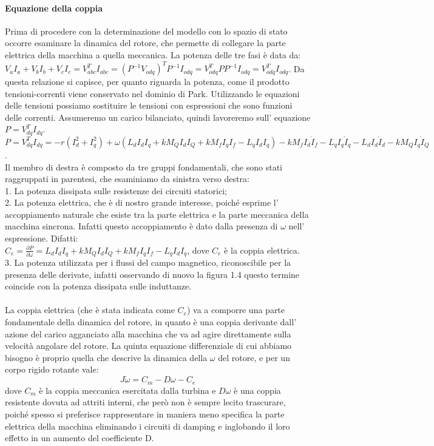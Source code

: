 \documentclass[Lau,noexaminfo]{sapthesis}
\begin{document}
	\paragraph{Equazione della coppia}
	Prima di procedere con la determinazione del modello con lo spazio di stato occorre esaminare la dinamica del rotore, che permette di collegare la parte elettrica della macchina a quella meccanica. La potenza delle tre fasi è data da:\\
	$V_a I_a + V_b I_b + V_c I_c = V^T_{abc} I_{abc}=(P^{-1}V_{odq})^T P^{-1}I_{odq}=V_{odq}^T P P^{-1} I_{odq}=V_{odq}^T I_{odq}$. Da questa relazione si capisce, per quanto riguarda la potenza, come il prodotto tensioni-correnti viene conservato nel dominio di Park. Utilizzando le equazioni delle tensioni possiamo sostituire le tensioni con espressioni che sono funzioni delle correnti. Assumeremo un carico bilanciato, quindi lavoreremo sull' equazione\\
	$P=V_{dq}^T I_{dq}$.\\
	$P=V_{dq}^T I_{dq}=-r(I_d^2+I_q^2) + \omega(L_d I_dI_q +kM_QI_dI_Q+kM_f I_qI_f-L_qI_dI_q) -kM_f I_d \dot{I}_f -L_qI_q \dot{I}_q - L_dI_d\dot{I}_d -kM_QI_q\dot{I}_Q$.\\
	Il membro di destra è composto da tre gruppi fondamentali, che sono stati raggruppati in parentesi, che esaminiamo da sinistra verso destra:\\
	1. La potenza dissipata sulle resistenze dei circuiti statorici;\\
	2. La potenza elettrica, che è di nostro grande interesse, poiché esprime l' accoppiamento naturale che esiste tra la parte elettrica e la parte meccanica della macchina sincrona. Infatti questo accoppiamento è dato dalla presenza di $\omega$ nell' espressione. Difatti:\\
	$C_e=\frac{\partial P}{\partial \omega} = L_dI_dI_q+kM_QI_dI_Q+kM_fI_qI_f-L_qI_dI_q $, dove $C_e$ è la coppia elettrica.\\
	3. La potenza utilizzata per i flussi del campo magnetico, riconoscibile per la presenza delle derivate, infatti osservando di nuovo la figura 1.4 questo termine coincide con la potenza dissipata sulle induttanze.\\\\
	La coppia elettrica (che è stata indicata come $C_e$) va a comporre una parte fondamentale della dinamica del rotore, in quanto è una coppia derivante dall' azione del carico agganciato alla macchina che va ad agire direttamente sulla velocità angolare del rotore. La quinta equazione differenziale di cui abbiamo bisogno è proprio quella che descrive la dinamica della $\omega$ del rotore, e per un corpo rigido rotante vale:\\
	\begin{equation}
	J\dot{\omega}=C_m - D\omega - C_e 
	\end{equation} dove $C_m$ è la coppia meccanica esercitata dalla turbina e $D\omega$ è una coppia resistente dovuta ad attriti interni, che però non è sempre lecito trascurare, poiché spesso si preferisce rappresentare in maniera meno specifica la parte elettrica della macchina eliminando i circuiti di damping e inglobando il loro effetto in un aumento del coefficiente D.
\end{document}
